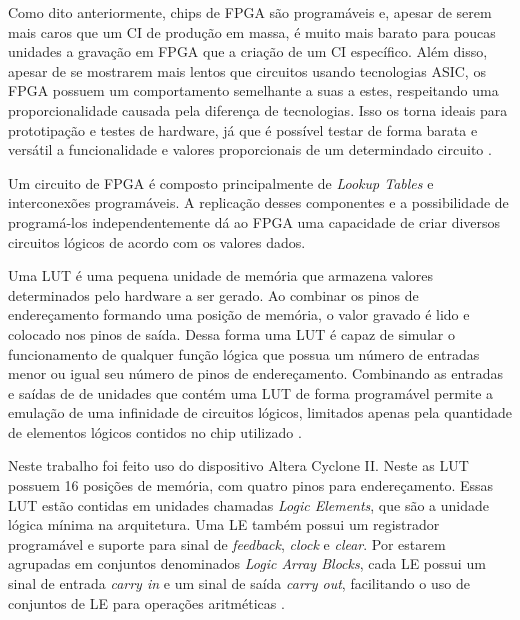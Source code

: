 Como dito anteriormente, chips de FPGA são programáveis e, apesar de serem mais caros que um CI de produção em massa, é muito mais barato para poucas unidades a gravação em FPGA que a criação de um CI específico. Além disso, apesar de se mostrarem mais lentos que circuitos usando tecnologias ASIC, os FPGA possuem um comportamento semelhante a suas a estes, respeitando uma proporcionalidade causada pela diferença de tecnologias. Isso os torna ideais para prototipação e testes de hardware, já que é possível testar de forma barata e versátil a funcionalidade e valores proporcionais de um determindado circuito \cite{tanenbaum2009organizacao}.

Um circuito de FPGA é composto principalmente de \textit{Lookup Tables} e interconexões programáveis. A replicação desses componentes e a possibilidade de programá-los independentemente dá ao FPGA uma capacidade de criar diversos circuitos lógicos de acordo com os valores dados.

Uma LUT é uma pequena unidade de memória que armazena valores determinados pelo hardware a ser gerado. Ao combinar os pinos de endereçamento formando uma posição de memória, o valor gravado é lido e colocado nos pinos de saída. Dessa forma uma LUT é capaz de simular o funcionamento de qualquer função lógica que possua um número de entradas menor ou igual seu número de pinos de endereçamento. Combinando as entradas e saídas de de unidades que contém uma LUT de forma programável permite a emulação de uma infinidade de circuitos lógicos, limitados apenas pela quantidade de elementos lógicos contidos no chip utilizado \cite{tanenbaum2009organizacao}.

Neste trabalho foi feito uso do dispositivo Altera Cyclone II. Neste as LUT possuem 16 posições de memória, com quatro pinos para endereçamento. Essas LUT estão contidas em unidades chamadas \textit{Logic Elements}, que são a unidade lógica mínima na arquitetura. Uma LE também possui um registrador programável e suporte para sinal de \textit{feedback}, \textit{clock} e \textit{clear}. Por estarem agrupadas em conjuntos denominados \textit{Logic Array Blocks}, cada LE possui um sinal de entrada \textit{carry in} e um sinal de saída \textit{carry out}, facilitando o uso de conjuntos de LE para operações aritméticas \cite{altera2007cyclone}.